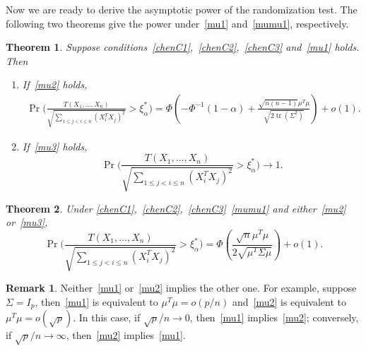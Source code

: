 \documentclass[review]{elsarticle}
\DeclareMathOperator{\mytr}{tr}
\theoremstyle{plain}
\newtheorem{theorem}{\quad\quad Theorem}
\theoremstyle{definition}
\newtheorem{remark}{\quad\quad Remark}
\theoremstyle{remark}
\begin{document}
Now we are ready to derive the asymptotic power of the randomization test.
The following two theorems give the power under~\eqref{mu1} and~\eqref{mumu1}, respectively.

\begin{theorem}\label{theoremPower}
    Suppose conditions~\eqref{chenC1},~\eqref{chenC2},~\eqref{chenC3} and~\eqref{mu1} holds. Then
    \begin{enumerate}
        \item
    If~\eqref{mu2} holds,
    \begin{equation}\label{oPower}
        \begin{aligned}
            \Pr\Big(\frac{T( X_1,\ldots, X_n)}{\sqrt{\sum_{1\leq j<i\leq n}{(X_i^T X_j)}^2}}>\xi_{\alpha}^* \Big)
            =
            \Phi(-\Phi^{-1}(1-\alpha)+\frac{\sqrt{n(n-1)}\mu^T\mu}{\sqrt{2\mytr (\Sigma^2)}})+o(1).
        \end{aligned}
    \end{equation}
\item
    If~\eqref{mu3} holds,
    \begin{equation*}
            \Pr\Big(\frac{T( X_1,\ldots, X_n)}{\sqrt{\sum_{1\leq j<i\leq n}{(X_i^T X_j)}^2}}>\xi_{\alpha}^* \Big)\to 1.
    \end{equation*}
    \end{enumerate}
\end{theorem}

\begin{theorem}\label{theoremPower2}
    Under \eqref{chenC1},~\eqref{chenC2},~\eqref{chenC3}~\eqref{mumu1} and either~\eqref{mu2} or~\eqref{mu3},
    \begin{equation*}
            \Pr\Big(\frac{T( X_1,\ldots, X_n)}{\sqrt{\sum_{1\leq j<i\leq n}{(X_i^T X_j)}^2}}>\xi_{\alpha}^* \Big)
            =
            \Phi(\frac{\sqrt{n}\mu^T\mu}{2\sqrt{\mu^T \Sigma \mu}})+o(1).
    \end{equation*}
\end{theorem}

\begin{remark}
    Neither~\eqref{mu1} or~\eqref{mu2} implies the other one.
    For example, suppose $\Sigma=I_p$, then~\eqref{mu1} is equivalent to $\mu^T\mu=o(p/n)$ and~\eqref{mu2} is equivalent to $\mu^T \mu =o(\sqrt{p})$.
    In this case, if $\sqrt{p}/n\to 0$, then~\eqref{mu1} implies~\eqref{mu2}; conversely, if $\sqrt{p}/n\to \infty$, then~\eqref{mu2} implies~\eqref{mu1}.
\end{remark}
\end{document}

